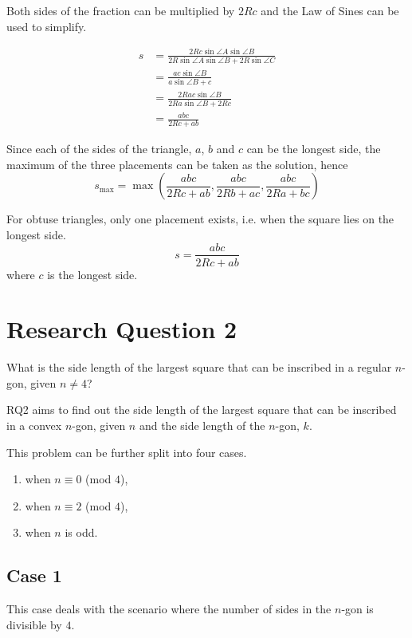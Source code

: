 \documentclass[12pt]{scrartcl}
\begin{document}
Both sides of the fraction can be multiplied by $2Rc$ and the Law of Sines can be used to simplify.

\begin{align*}
	s & = \frac{2Rc\sin\angle{A}\sin\angle{B}}{2R\sin\angle{A}\sin \angle{B}+2R\sin \angle C} \\
	  & = \frac{ac\sin\angle{B}}{a\sin\angle{B}+c}                                            \\
	  & = \frac{2Rac\sin\angle{B}}{2Ra\sin\angle{B}+2Rc}                                      \\
	  & = \frac{abc}{2Rc+ab}
\end{align*}

Since each of the sides of the triangle, $a$, $b$ and $c$ can be the longest side,
the maximum of the three placements can be taken as the solution, hence
\begin{equation}
	s_{\text{max}} = \max\left(\dfrac{abc}{2Rc+ab},\dfrac{abc}{2Rb+ac},\dfrac{abc}{2Ra+bc}\right)
\end{equation}

For obtuse triangles, only one placement exists, i.e. when the square lies on the longest side.
\begin{equation}
	s = \dfrac{abc}{2Rc+ab}
\end{equation}
where $c$ is the longest side.

\pagebreak

\section{Research Question 2}
What is the side length of the largest square that can be inscribed in a regular $n$-gon, given $n \neq 4$?

RQ2 aims to find out the side length of the largest square that can be inscribed in a convex $n$-gon,
given $n$ and the side length of the $n$-gon, $k$.

This problem can be further split into four cases.
\begin{enumerate}
	\item when \(n \equiv 0\) (mod $4$),
	\item when \(n \equiv 2\) (mod $4$),
	\item when $n$ is odd.
\end{enumerate}

\subsection{Case 1}
This case deals with the scenario where the number of sides in the $n$-gon is divisible by $4$.
\end{document}
